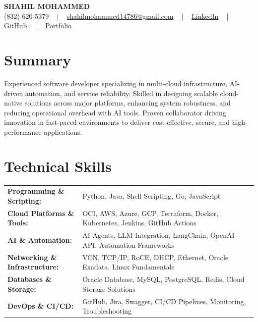 \documentclass[letterpaper,11pt]{article}
\begin{document}
\begin{center}
    {\fontsize{14pt}{12pt}\selectfont \textbf{\MakeUppercase{Shahil Mohammed}}}\\ \vspace{2pt}
    \fontsize{10pt}{12pt}\selectfont (832) 620-5379 ~ | ~ \href{mailto:shahilmohammed14786@gmail.com}{shahilmohammed14786@gmail.com} ~ | ~  
    \href{https://www.linkedin.com/in/shahil-mohammed-9652931a1/}{\color{blue}\underline{LinkedIn}}  ~ | ~ 
    \href{https://github.com/freakbeast14}{\color{blue}\underline{GitHub}} ~ | ~ 
    \href{https://shahil-mohammed.netlify.app/}{\color{blue}\underline{Portfolio}}
    \vspace{-8pt}
\end{center}

\section{Summary}
\fontsize{9pt}{10pt}\selectfont
Experienced software developer specializing in multi-cloud infrastructure, AI-driven automation, and service reliability. Skilled in designing scalable cloud-native solutions across major platforms, enhancing system robustness, and reducing operational overhead with AI tools. Proven collaborator driving innovation in fast-paced environments to deliver cost-effective, secure, and high-performance applications.
 \vspace{-5pt}
 
\section{Technical Skills}
        \vspace{-14pt}
        \begin{table}[h]
            \fontsize{9pt}{10pt}\selectfont
            \begin{tabular}{p{0.3\linewidth} p{0.7\linewidth}}
                \textbf{Programming \& Scripting:} & Python, Java, Shell Scripting, Go, JavaScript \\
                \textbf{Cloud Platforms \& Tools:} & OCI, AWS, Azure, GCP, Terraform, Docker, Kubernetes, Jenkins, GitHub Actions \\
                \textbf{AI \& Automation:} & AI Agents, LLM Integration, LangChain, OpenAI API, Automation Frameworks \\
                \textbf{Networking \& Infrastructure:} & VCN, TCP/IP, RoCE, DHCP, Ethernet, Oracle Exadata, Linux Fundamentals \\
                \textbf{Databases \& Storage:} & Oracle Database, MySQL, PostgreSQL, Redis, Cloud Storage Solutions \\
                \textbf{DevOps \& CI/CD:} & GitHub, Jira, Swagger, CI/CD Pipelines, Monitoring, Troubleshooting \\
            \end{tabular}
        \end{table}
 \vspace{-15pt}
 
\end{document}
